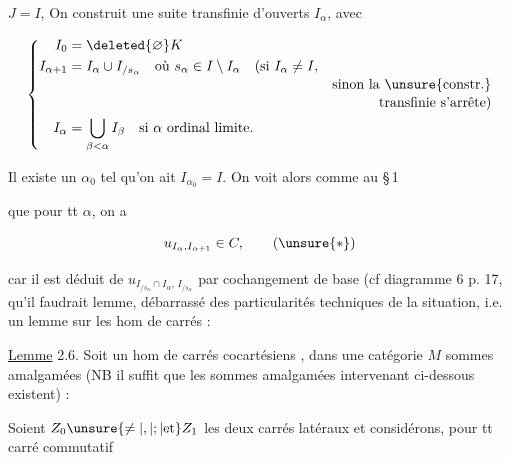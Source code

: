  $J=I$,  On construit une suite transfinie  d'ouverts $I_\alpha$, avec

\[
 \left\{\begin{aligned}
 I_0&=\deleted{\varnothing}K\\
 I_{\alpha+1}&= I_\alpha\cup I_{/s_\alpha}\quad\text{où }s_\alpha\in I\setminus I_\alpha
 \quad(\text{si }I_\alpha\ne I,\\[-2pt]
 &&\text{sinon la \unsure{constr.}}\\[-2pt]
 &&\text{transfinie s'arrête})\\
 I_\alpha&=\bigcup_{\beta<\alpha}I_\beta\quad\text{si $\alpha$ ordinal limite.}
 \end{aligned}\right.
\]

Il existe un $\alpha_0$ tel qu'on ait $I_{\alpha_0}=I$. On voit alors comme au \S\,1



que pour tt $\alpha$,  on a

\[
 u_{I_\alpha,I_{\alpha+1}}\in C,\tag*{$(\unsure{*})$}
\]

car il est déduit de $u_{I_{/s_\alpha}\cap I_\alpha,\,I_{/s_\alpha}}$ par cochangement de base (cf diagramme 6 p. 17, qu'il faudrait   lemme, débarrassé des particularités techniques de la situation, i.e. un lemme sur les hom de carrés  :

\uline{Lemme} 2.6. Soit un hom de carrés cocartésiens , dans une catégorie $M$   sommes amalgamées (NB il suffit que les sommes amalgamées intervenant ci-dessous existent) :


Soient $Z_0\unsure{\ne|,|;|\text{et}}Z_1$ les deux carrés latéraux et considérons, pour tt carré commutatif

